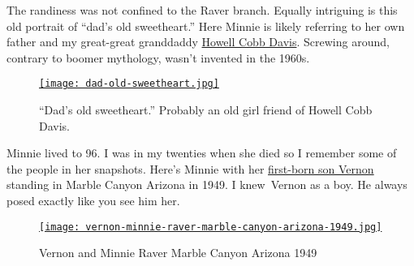 The randiness was not confined to the Raver branch. Equally intriguing
is this old portrait of ``dad's old sweetheart.'' Here Minnie is likely
referring to her own father and my great-great granddaddy
\href{http://www.findagrave.com/cgi-bin/fg.cgi?page=gr\&GSln=Davis\&GSfn=Howell\&GSmn=C\&GSby=1850\&GSbyrel=after\&GSdy=1950\&GSdyrel=before\&GSst=28\&GScntry=4\&GSob=n\&GRid=67837689\&df=all\&}{Howell
Cobb Davis}. Screwing around, contrary to boomer mythology, wasn't
invented in the 1960s.



\begin{SCfigure}
\centering
\href{http://conceptcontrol.smugmug.com/People/Minnie-Raver/i-GGmLK2W/A}{\texttt{[image: dad-old-sweetheart.jpg]}}
\caption{``Dad's old sweetheart.'' Probably an old girl friend of Howell Cobb Davis.}
\label{fig:4230X3}
\end{SCfigure}


Minnie lived to 96. I was in my twenties when she died so I remember
some of the people in her snapshots. Here's Minnie with her
\href{http://www.findagrave.com/cgi-bin/fg.cgi?page=gr\&GRid=61581142}{first-born
son Vernon} standing in Marble Canyon Arizona in 1949. I knew~Vernon as
a boy. He always posed exactly like you see him her.



\begin{SCfigure}
\centering
\href{http://conceptcontrol.smugmug.com/People/Minnie-Raver/i-DTmc5Zb/A}{\texttt{[image: vernon-minnie-raver-marble-canyon-arizona-1949.jpg]}}
\caption{Vernon and Minnie Raver Marble Canyon Arizona 1949}
\label{fig:4230X4}
\end{SCfigure}


